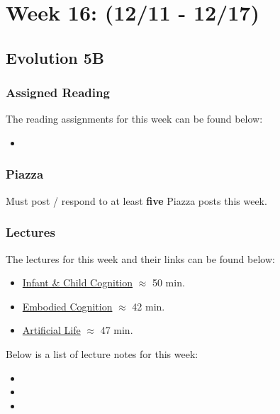 \clearpage
\chapter{Week 16: (12/11 - 12/17)}

\section{Evolution 5B}

\subsection{Assigned Reading}

The reading assignments for this week can be found below:

\begin{itemize}
    \item {}
\end{itemize}

\subsection{Piazza}

Must post / respond to at least \textbf{five} Piazza posts this week.  

\subsection{Lectures}

The lectures for this week and their links can be found below:

\begin{itemize}
    \item \href{https://applied.cs.colorado.edu/mod/hvp/view.php?id=49442}{Infant \& Child Cognition} $\approx$ 50 min.
    \item \href{https://applied.cs.colorado.edu/mod/hvp/view.php?id=49443}{Embodied Cognition} $\approx$ 42 min.
    \item \href{https://applied.cs.colorado.edu/mod/hvp/view.php?id=49444}{Artificial Life} $\approx$ 47 min.
\end{itemize}

\noindent Below is a list of lecture notes for this week:

\begin{itemize}
    \item {}
    \item {}
    \item {}
\end{itemize}

